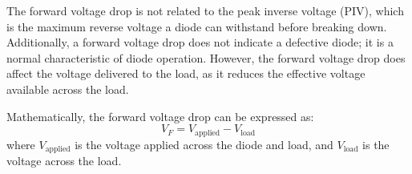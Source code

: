 The forward voltage drop is not related to the peak inverse voltage (PIV), which is the maximum reverse voltage a diode can withstand before breaking down. Additionally, a forward voltage drop does not indicate a defective diode; it is a normal characteristic of diode operation. However, the forward voltage drop does affect the voltage delivered to the load, as it reduces the effective voltage available across the load.

Mathematically, the forward voltage drop can be expressed as:
\[
V_F = V_{\text{applied}} - V_{\text{load}}
\]
where \(V_{\text{applied}}\) is the voltage applied across the diode and load, and \(V_{\text{load}}\) is the voltage across the load.

